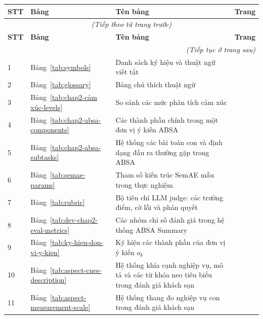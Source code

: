 \documentclass[12pt,a4paper]{report}
\begin{document}
\renewcommand{\arraystretch}{1.18}
\begin{longtable}{|p{}|p{}|p{}|p{}|}
\hline
\textbf{STT} & \textbf{Bảng} & \textbf{Tên bảng} & \textbf{Trang} \\ \hline
\endfirsthead
\multicolumn{4}{|c|}{\textit{(Tiếp theo từ trang trước)}} \\ \hline
\textbf{STT} & \textbf{Bảng} & \textbf{Tên bảng} & \textbf{Trang} \\ \hline
\endhead
\multicolumn{4}{|r|}{\textit{(Tiếp tục ở trang sau)}} \\ \hline
\endfoot
\hline
\endlastfoot

1 & Bảng~\ref{tab:symbols} & Danh sách ký hiệu và thuật ngữ viết tắt & \pageref{tab:symbols} \\ \hline
2 & Bảng~\ref{tab:glossary} & Bảng chú thích thuật ngữ & \pageref{tab:glossary} \\ \hline
3 & Bảng~\ref{tab:chap2-cảm xúc-levels} & So sánh các mức phân tích cảm xúc & \pageref{tab:chap2-cảm xúc-levels} \\ \hline
4 & Bảng~\ref{tab:chap2-absa-components} & Các thành phần chính trong một đơn vị ý kiến ABSA & \pageref{tab:chap2-absa-components} \\ \hline
5 & Bảng~\ref{tab:chap2-absa-subtasks} & Hệ thống các bài toán con và định dạng đầu ra thường gặp trong ABSA & \pageref{tab:chap2-absa-subtasks} \\ \hline
6 & Bảng~\ref{tab:semae-params} & Tham số kiến trúc SemAE mẫu trong thực nghiệm & \pageref{tab:semae-params} \\ \hline
7 & Bảng~\ref{tab:rubric} & Bộ tiêu chí LLM judge: các trường điểm, cờ lỗi và phán quyết & \pageref{tab:rubric} \\ \hline
8 & Bảng~\ref{tab:dev-chap2-eval-metrics} & Các nhóm chỉ số đánh giá trong hệ thống ABSA Summary & \pageref{tab:dev-chap2-eval-metrics} \\ \hline
9 & Bảng~\ref{tab:ky-hieu-don-vi-y-kien} & Ký hiệu các thành phần của đơn vị ý kiến $o_k$ & \pageref{tab:ky-hieu-don-vi-y-kien} \\ \hline
10 & Bảng~\ref{tab:aspect-cues-description} & Hệ thống khía cạnh nghiệp vụ, mô tả và các từ khóa neo tiêu biểu trong đánh giá khách sạn & \pageref{tab:aspect-cues-description} \\ \hline
11 & Bảng~\ref{tab:aspect-measurement-scale} & Hệ thống thang đo nghiệp vụ con trong đánh giá khách sạn & \pageref{tab:aspect-measurement-scale} \\ \hline

\end{longtable}
\end{document}
